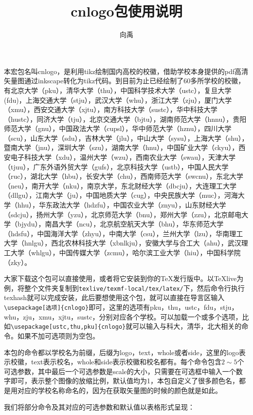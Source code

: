 \documentclass{ctexart}
\title{cnlogo包使用说明}\author{向禹}
\begin{document}
\maketitle
本宏包名叫cnlogo，是利用tikz绘制国内高校的校徽，借助学校本身提供的pdf高清矢量图通过inkscape转化为tikz代码。到目前为止已经绘制了60多所学校的校徽，有北京大学（pku），清华大学（thu），中国科学技术大学（ustc），复旦大学(fdu)，上海交通大学（stju），武汉大学（whu），浙江大学（zju），厦门大学（xmu），西安交通大学（xjtu），南方科技大学（sustc），华中科技大学（hustc），同济大学（tju），北京交通大学（bjtu），湖南师范大学（hnnu），贵阳师范大学（gnu），中国政法大学（cupsl），华中师范大学（hznu），四川大学（scu），山东大学（sdu），吉林大学（jlu），中山大学（sysu），上海大学（shu），暨南大学（jnu），深圳大学（szu），湖南大学（hnu），中国矿业大学（ckyu），西安电子科技大学（xdu），温州大学（wzu），西南农业大学（swau），天津大学（tjuu），广东外语外贸大学（gufs），北京科技大学（ustb），中国人民大学（ruc），湖北大学（hbu），长安大学（chu），西南师范大学（swcnu），东北大学（neu），南开大学（nku），南京大学，东北财经大学（dbcju），大连理工大学（dllgu），江南大学（ju），中国地质大学（cug），中央民族大学（muc），河海大学（hhu），华东政法大学（hdzfu），中国农业大学（znyu），山东财经大学（sdcju），扬州大学（yzu），北京师范大学（bnu），郑州大学（zzu），北京邮电大学（bjydu），南昌大学（ncu），北京航空航天大学（bhu），华东师范大学（hdsfu），中国海洋大学（zhyu），中南大学（csu），兰州大学（lzu），华南理工大学（hnlgu），西北农林科技大学（xbnlkju），安徽大学与合工大（ahu），武汉理工大学（whlgu），中国传媒大学（zcmu），哈尔滨工业大学（hiu），中国科学院（zky）。


大家下载这个包可以直接使用，或者将它安装到你的\TeX 发行版中。以\TeX live为例，将整个文件夹复制到\texttt{texlive/texmf-local/tex/latex/}下，然后命令行执行texhash就可以完成安装，此后要想使用这个包，就可以直接在导言区输入\verb|\usepackage[选项]{cnlogo}|即可，这里的选项有pku，thu，ustc，fdu，stju，whu，zju，xmu，xjtu，sustc，分别对应各个学校。可以加载一个或多个选项，比如\verb|\usepackage[ustc,thu,pku]{cnlogo}|就可以输入与科大，清华，北大相关的命令。如果不加可选项则为空包。

本包的命令都以学校名为前缀，后缀为logo，text，whole或者side，这里的logo表示校徽，text表示校名，whole和side表示校徽和校名都有。每个命令包含$2\sim5$个可选参数，其中最后一个可选参数是scale的大小，只需要在可选框中输入一个数字即可，表示整个图像的放缩比例，默认值均为1，本包自定义了很多颜色名，都是用对应的学校名称命名的，因为在获取矢量图的时候的颜色就是如此。

我们将部分命令及其对应的可选参数和默认值以表格形式呈现：
\end{document}
